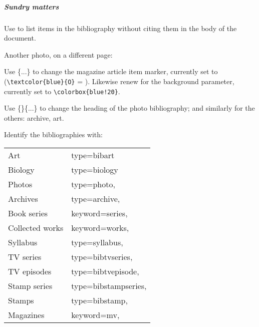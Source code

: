 


\ddivider






\newpage





\subparagraph{Sundry matters}
Use  to list items in the bibliography without citing them in the body of the document. 

Another photo, on a different page: 

\nocite{bsm142,
bsm143,
bsm144,
bsm145,
bsm146,
bsm147,
bsm148,
bsm149,
bsm150,
bsm151,
bsm152,
bsm153,
bsm154,
bsm155,
bsm156,
bsm157,
}

Use
\{...\}
to change the magazine article item marker, currently set to
 (\verb|\textcolor{blue}{O}| = \itemmarkerdefault).
Likewise renew 
for the background parameter, currently set to
\verb|\colorbox{blue!20}|.

Use 
\{\}\{...\} 
to change the heading of the photo bibliography; and similarly for the others: 
archive, art.

Identify the bibliographies with:

\begin{tabular}{ll}
Art
&
type=bibart 
\\
Biology
&
type=biology
\\
Photos
& 
type=photo,
\\
Archives
& 
type=archive,
\\
Book series
& 
keyword=series,
\\
Collected works
& 
keyword=works,
\\
Syllabus
& 
type=syllabus,
\\
TV series
& 
type=bibtvseries,
\\
TV episodes
& 
type=bibtvepisode,
\\
Stamp series
& 
type=bibstampseries,
\\
Stamps
& 
type=bibstamp,
\\
Magazines
& 
keyword=mv,
\\
\end{tabular}


